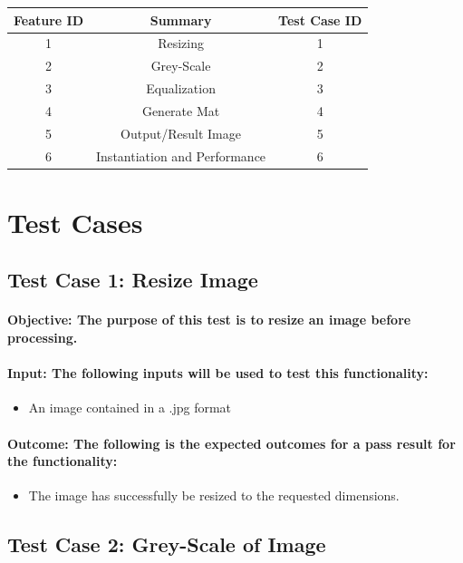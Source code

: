 \documentclass[a4paper,12pt]{report}
\begin{document}
	\begin{center}
	\begin{tabular}{ || c | c | c ||}
		\hline
		Feature ID & Summary & Test Case ID \\[1ex]
		\hline\hline
		1 &  Resizing & 1 \\
		2 &  Grey-Scale & 2\\
		3 &  Equalization & 3\\
		4 &  Generate Mat & 4\\
		5 &  Output/Result Image & 5\\
		6 &  Instantiation and Performance & 6\\
		\hline
	\end{tabular}
	\end{center}

\newpage
\section{Test Cases}
\label{sec:Cases}
	\subsection{Test Case 1: Resize Image}
	\paragraph{Objective: The purpose of this test is to resize an image before processing.}
	\paragraph{Input: The following inputs will be used to test this functionality:}
		\begin{itemize}
			\item An image contained in a .jpg format
		\end{itemize}
	\paragraph{Outcome: The following is the expected outcomes for a pass result for the functionality:}
		\begin{itemize}
			\item The image has successfully be resized to the requested dimensions.
		\end{itemize}
		
	\subsection{Test Case 2: Grey-Scale of Image}
\end{document}
